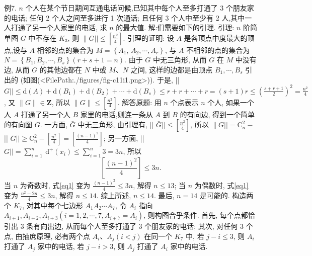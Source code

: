 例7. $n$ 个人在某个节日期间互通电话问候,已知其中每个人至多打通了 3 个朋友家的电话; 任何 2 个人之间至多进行 1 次通话; 且任何 3 个人中至少有 2 人,其中一人打通了另一个人家里的电话, 求 $n$ 的最大值.
解:们需要如下的引理.
引理: $n$ 阶简单图 $G$ 中不存在 $K_3$, 则 $\| G|| \leqslant\left[\frac{n^2}{4}\right]$.
引理的证明: 设 $A$ 是各顶点中度最大的顶点,设与 $A$ 相邻的点的集合为 $M=\left\{A_1\right.$, $\left.A_2, \cdots, A_r\right\}$, 与 $A$ 不相邻的点的集合为 $N=\left\{B_1, B_2, \cdots, B_s\right\}(r+s+1=n)$. 由于 $G$ 中无三角形, 从而 $G$ 在 $M$ 中没有边, 从而 $G$ 的其他边都在 $N$ 中或 $M 、 N$ 之间, 这样的边都是由顶点 $B_1, \cdots, B_s$ 引出的 (如图(<FilePath:./figures/fig-c11i1.png>)).
于是, ||$G|| \leqslant \mathrm{d}(A)+\mathrm{d}\left(B_1\right)+\mathrm{d}\left(B_2\right)+\cdots+\mathrm{d}\left(B_s\right) \leqslant r+r+\cdots+ r=(s+1) r \leqslant\left(\frac{s+r+1}{2}\right)^2=\frac{n^2}{4}$,
又 $\|G\| \in \mathbf{Z}$, 所以 $\|G\| \leqslant\left[\frac{n^2}{4}\right]$.
解答原题: 用 $n$ 个点表示 $n$ 个人, 如果一个人 $A$ 打通了另一个人 $B$ 家里的电话,则连一条从 $A$ 到 $B$ 的有向边, 得到一个简单的有向图 $G$.
一方面, $\bar{G}$ 中无三角形, 由引理有, || $\bar{G}|| \leqslant\left[\frac{n^2}{4}\right]$, 所以 $\| G||=\mathrm{C}_n^2-$ || $\bar{G}|| \geqslant \mathrm{C}_n^2-\left[\frac{n^2}{4}\right]=\left[\frac{(n-1)^2}{4}\right]$; 另一方面, ||$G||=\sum_{i=1}^n \mathrm{~d}^{+}\left(x_i\right) \leqslant \sum_{i=1}^n 3=3 n$, 所以
$$
\left[\frac{(n-1)^2}{4}\right] \leqslant 3 n . \label{eq1}
$$
当 $n$ 为奇数时, 式\ref{eq1} 变为 $\frac{(n-1)^2}{4} \leqslant 3 n$, 解得 $n \leqslant 13$; 当 $n$ 为偶数时, 式\ref{eq1} 变为 $\frac{n^2-2 n}{4} \leqslant 3 n$, 解得 $n \leqslant 14$.
综上所述, $n \leqslant 14$.
最后, $n=14$ 是可能的.
构造两个 $K_7$, 对其中每个七边形 $A_1 A_2 \cdots A_7$, 令 $A_i$ 指向 $A_{i+1}, A_{i+2}, A_{i+3}\left(i=1,2, \cdots, 7, A_{i+7}=A_i\right)$, 则构图合乎条件.
首先, 每个点都恰引出 3 条有向出边, 从而每个人至多打通了 3 个朋友家的电话;
其次, 对任何 3 个点, 由抽庶原理, 必有两个点 $A_i 、 A_j(i<j)$ 在同一个 $K_7$ 中, 若 $j-i \leqslant 3$, 则 $A_i$ 打通了 $A_j$ 家中的电话, 若 $j-i>3$, 则 $A_j$ 打通了 $A_i$ 家中的电话.



